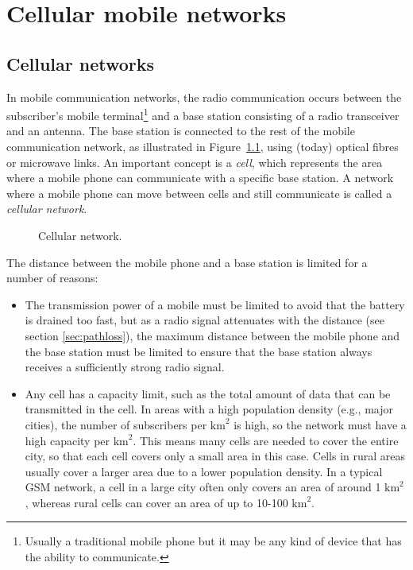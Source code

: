 \clearpage\chapter{Cellular mobile networks}

\section{Cellular networks}\label{sec:cellularnetworks}
In mobile communication networks, the radio communication occurs between the subscriber's mobile terminal\footnote{Usually a traditional mobile phone but it may be any kind of device that has the ability to communicate.} and a base station consisting of a radio transceiver and an antenna. The base station is connected to the rest of the mobile communication network, as illustrated in Figure~\ref{fig:ms_and_basestation}, using (today) optical fibres or microwave links. An important concept is a \emph{cell}, which represents the area where a mobile phone can communicate with a specific base station. A network where a mobile phone can move between cells and still communicate is called a \emph{cellular network}.

\begin{figure}[htbp]
\centering
{}
\captionsetup{format=hang,margin=2cm}
\caption{\label{fig:ms_and_basestation}Cellular network.}
\end{figure}

The distance between the mobile phone and a base station is limited for a number of reasons:

\begin{itemize}
%
\item The transmission power of a mobile must be limited to avoid that the battery is drained too fast, but as a radio signal attenuates with the distance (see section \ref{sec:pathloss}), the maximum distance between the mobile phone and the base station must be limited to ensure that the base station always receives a sufficiently strong radio signal.
%
\item Any cell has a capacity limit, such as the total amount of data that can be transmitted in the cell. In areas with a high population density (e.g., major cities), the number of subscribers per $\textrm{km}^2$ is high, so the network must have a high capacity per $\textrm{km}^2$.  This means many cells are needed to cover the entire city, so that each cell covers only a small area in this case. Cells in rural areas usually cover a larger area due to a lower population density. In a typical GSM network, a cell in a large city often only covers an area of around 1 $\textrm{km}^2$, whereas rural cells can cover an area of up to 10-100$\textrm{ km}^2$.
%
\end{itemize}

